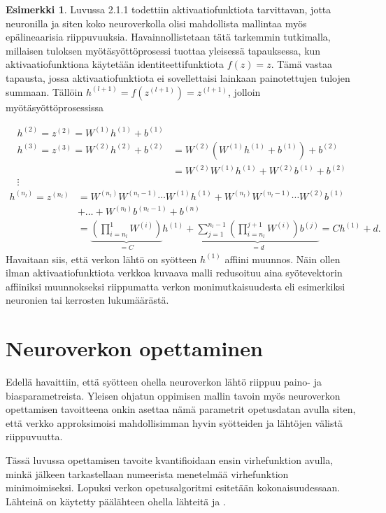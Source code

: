 \documentclass[12pt,a4paper,finnish,oneside,titlepage]{article}
\theoremstyle{plain}
\theoremstyle{definition}
\newtheorem{esim}[lause]{Esimerkki}    %
\theoremstyle{remark}
\begin{document}
\begin{esim}
Luvussa 2.1.1 todettiin aktivaatiofunktiota tarvittavan, jotta neuronilla ja siten koko neuroverkolla olisi mahdollista mallintaa myös epälineaarisia riippuvuuksia. Havainnollistetaan tätä tarkemmin tutkimalla, millaisen tuloksen myötäsyöttöprosessi tuottaa yleisessä tapauksessa, kun aktivaatiofunktiona käytetään identiteettifunktiota \(f(z)=z\). Tämä vastaa tapausta, jossa aktivaatiofunktiota ei sovellettaisi lainkaan painotettujen tulojen summaan. Tällöin \(h^{(l+1)}=f\left(z^{(l+1)}\right)=z^{(l+1)}\), jolloin myötäsyöttöprosessissa

\begin{align*}
    h^{(2)}=z^{(2)}=W^{(1)}h^{(1)}+b^{(1)}\\
    h^{(3)}=z^{(3)}=W^{(2)}h^{(2)}+b^{(2)}&=W^{(2)}(W^{(1)}h^{(1)}+b^{(1)})+b^{(2)}\\
    &=W^{(2)}W^{(1)}h^{(1)}+W^{(2)}b^{(1)}+b^{(2)}\\ \vdots
\end{align*}\begin{align*}
    h^{(n_l)}=z^{(n_l)}&=W^{(n_l)}W^{(n_l-1)}\cdots W^{(1)}h^{(1)}+W^{(n_l)}W^{(n_l-1)}\cdots W^{(2)}b^{(1)}\\ &+\ldots +W^{(n_l)}b^{(n_l-1)}+b^{(n)}\\
    &=\underbrace{\left(\prod_{i=n_l}^{1}W^{(i)}\right)}_{=C} h^{(1)}+\underbrace{\sum_{j=1}^{n_l-1} \left(\prod_{i=n_l}^{j+1} W^{(i)}\right) b^{(j)}}_{=d}=Ch^{(1)}+d.
\end{align*}
Havaitaan siis, että verkon lähtö on syötteen \(h^{(1)}\) affiini muunnos. Näin ollen ilman aktivaatiofunktiota verkkoa kuvaava malli redusoituu aina syötevektorin affiiniksi muunnokseksi riippumatta verkon monimutkaisuudesta eli esimerkiksi neuronien tai kerrosten lukumäärästä.
\end{esim}

\section{Neuroverkon opettaminen}\label{sec:toinen}
Edellä havaittiin, että syötteen ohella neuroverkon lähtö riippuu paino- ja biasparametreista. Yleisen ohjatun oppimisen mallin tavoin myös neuroverkon opettamisen tavoitteena onkin asettaa nämä parametrit opetusdatan avulla siten, että verkko approksimoisi mahdollisimman hyvin syötteiden ja lähtöjen välistä riippuvuutta.

Tässä luvussa opettamisen tavoite kvantifioidaan ensin virhefunktion avulla, minkä jälkeen tarkastellaan numeerista menetelmää virhefunktion minimoimiseksi. Lopuksi verkon opetusalgoritmi esitetään kokonaisuudessaan. Lähteinä on käytetty päälähteen \cite{Z2b} ohella lähteitä \cite{stanf} ja \cite{deriv}.
\end{document}

